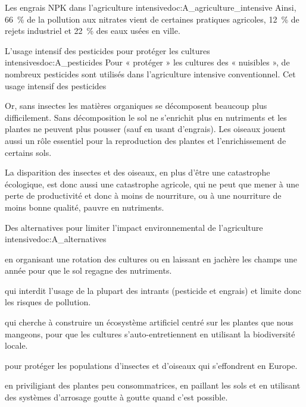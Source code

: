 \begin{doc}{Les engrais NPK dans l'agriculture intensive}{doc:A_agriculture_intensive}
  \vspace*{-12pt}
  Ainsi, \qty{66}{\percent} de la pollution aux nitrates vient de certaines pratiques agricoles, \qty{12}{\percent} de rejets industriel et \qty{22}{\percent} des eaux usées en ville.
\end{doc}

\begin{doc}{L'usage intensif des pesticides pour protéger les cultures intensives}{doc:A_pesticides}
  Pour « protéger » les cultures des « nuisibles », de nombreux pesticides sont utilisés dans l'agriculture intensive conventionnel.
  Cet usage intensif des pesticides 

  Or, sans insectes les matières organiques se décomposent beaucoup plus difficilement. Sans décomposition le sol ne s'enrichit plus en nutriments et les plantes ne peuvent plus pousser (sauf en usant d'engrais).
  Les oiseaux jouent aussi un rôle essentiel pour la reproduction des plantes et l'enrichissement de certains sols. 

  La disparition des insectes et des oiseaux, en plus d'être une catastrophe écologique, est donc aussi une catastrophe agricole, qui ne peut que mener à une perte de productivité et donc à moins de nourriture, ou à une nourriture de moins bonne qualité, pauvre en nutriments.
\end{doc}

\begin{doc}{Des alternatives pour limiter l'impact environnemental de l'agriculture intensive}{doc:A_alternatives}
  \begin{listePoints}
    \item {} en organisant une rotation des cultures ou en laissant en jachère les champs une année pour que le sol regagne des nutriments.
    \item {} qui interdit l'usage de la plupart des intrants (pesticide et engrais) et limite donc les risques de pollution.
    \item {} qui cherche à construire un écosystème artificiel centré sur les plantes que nous mangeons, pour que les cultures s'auto-entretiennent en utilisant la biodiversité locale.
    \item {} pour protéger les populations d'insectes et d'oiseaux qui s'effondrent en Europe.
    \item {} en priviligiant des plantes peu consommatrices, en paillant les sols et en utilisant des systèmes d'arrosage goutte à goutte quand c'est possible.
  \end{listePoints}
\end{doc}